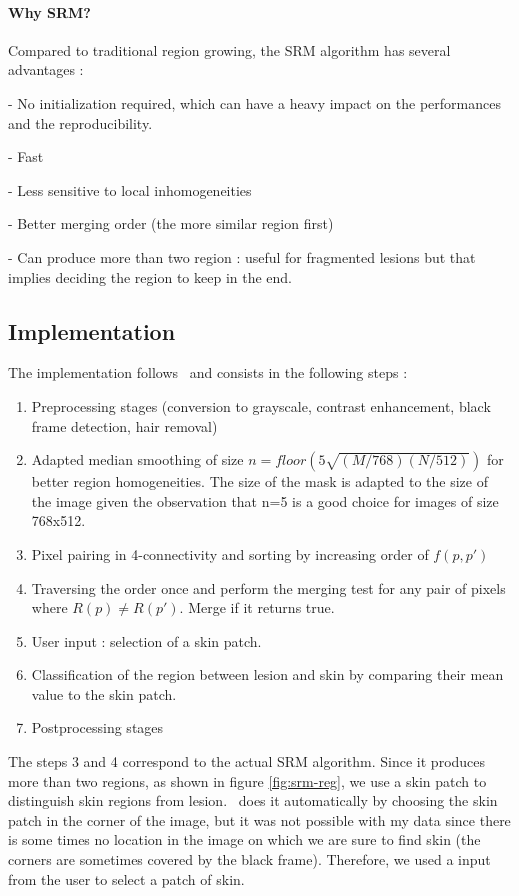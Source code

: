 \documentclass[a4paper,10pt]{article}
\begin{document}
\paragraph{Why SRM?}
Compared to traditional region growing, the SRM algorithm has several advantages :

- No initialization required, which can have a heavy impact on the performances and the reproducibility.

- Fast

- Less sensitive to local inhomogeneities 

- Better merging order (the more similar region first) 

- Can produce more than two region : useful for fragmented lesions but that implies deciding the region to keep in the end.

\subsection{Implementation}
The implementation follows~\cite{celebi_border_2008} and consists in the following steps :

\begin{enumerate}
	\item Preprocessing stages (conversion to grayscale, contrast enhancement, black frame detection, hair removal)
	\item Adapted median smoothing of size $n=floor\left( 5\sqrt{(M/768)(N/512)}\right)$ for better region homogeneities. The size of the mask is adapted to the size of the image given the observation that n=5 is a good choice for images of size 768x512.
	\item Pixel pairing in 4-connectivity and sorting by increasing order of $f(p,p')$
	\item Traversing the order once and perform the merging test for any pair of pixels where $R(p)\neq R(p')$. Merge if it returns true.
	\item User input : selection of a skin patch.
	\item Classification of the region between lesion and skin by comparing their mean value to the skin patch.
	\item Postprocessing stages 
\end{enumerate}

The steps 3 and 4 correspond to the actual SRM algorithm. Since it produces more than two regions, as shown in figure \ref{fig:srm-reg}, we use a skin patch to distinguish skin regions from lesion.~\cite{celebi_border_2008} does it automatically by choosing the skin patch in the corner of the image, but it was not possible with my data since there is some times no location in the image on which we are sure to find skin (the corners are sometimes covered by the black frame). Therefore, we used a input from the user to select a patch of skin. 
\end{document}
